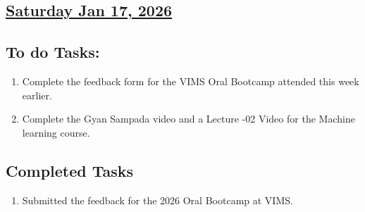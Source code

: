 \subsection*{\underline{Saturday Jan 17, 2026} }
\subsection*{To do Tasks:}
\begin{enumerate}
    \item Complete the feedback form for the VIMS Oral Bootcamp attended this week earlier. \cmark
    \item Complete the Gyan Sampada video and a Lecture -02 Video for the Machine learning course.\cmark
\end{enumerate}
\subsection*{Completed Tasks}
\begin{enumerate}[\ding{52}]  %
    \item Submitted the feedback for the 2026 Oral Bootcamp at VIMS.
\end{enumerate}
\starredline



